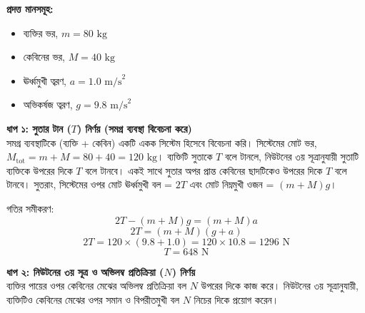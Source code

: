 \documentclass[12pt, a4paper]{article}
\begin{document}
\begin{tcolorbox}[solutionbox={সমাধান (Solution)}]
\noindent
\textbf{প্রদত্ত মানসমূহ:}
\begin{itemize}[leftmargin=*, parsep=0.3ex]
    \item ব্যক্তির ভর, $m = 80\text{ kg}$
    \item কেবিনের ভর, $M = 40\text{ kg}$
    \item ঊর্ধ্বমুখী ত্বরণ, $a = 1.0\text{ m/s}^2$
    \item অভিকর্ষজ ত্বরণ, $g = 9.8\text{ m/s}^2$
\end{itemize}

\vspace{0.5em}
\noindent
\textbf{ধাপ ১: সুতার টান ($T$) নির্ণয় (সমগ্র ব্যবস্থা বিবেচনা করে)} \\
সমগ্র ব্যবস্থাটিকে (ব্যক্তি + কেবিন) একটি একক সিস্টেম হিসেবে বিবেচনা করি। 
সিস্টেমের মোট ভর, $M_{\text{tot}} = m + M = 80 + 40 = 120\text{ kg}$।
ব্যক্তিটি সুতাকে $T$ বলে টানলে, নিউটনের ৩য় সূত্রানুযায়ী সুতাটি ব্যক্তিকে উপরের দিকে $T$ বলে টানবে। একই সাথে সুতার অপর প্রান্ত কেবিনের ছাদটিকেও উপরের দিকে $T$ বলে টানবে।
সুতরাং, সিস্টেমের ওপর মোট ঊর্ধ্বমুখী বল = $2T$ এবং মোট নিম্নমুখী ওজন = $(m + M)g$।

গতির সমীকরণ:
$$2T - (m + M)g = (m + M)a$$ 
$$2T = (m + M)(g + a)$$
$$2T = 120 \times (9.8 + 1.0) = 120 \times 10.8 = 1296\text{ N}$$ 
$$T = 648\text{ N}$$

\vspace{0.5em}
\noindent
\textbf{ধাপ ২: নিউটনের ৩য় সূত্র ও অভিলম্ব প্রতিক্রিয়া ($N$) নির্ণয়} \\
ব্যক্তির পায়ের ওপর কেবিনের মেঝের অভিলম্ব প্রতিক্রিয়া বল $N$ উপরের দিকে কাজ করে। নিউটনের ৩য় সূত্রানুযায়ী, ব্যক্তিটিও কেবিনের মেঝের ওপর সমান ও বিপরীতমুখী বল $N$ নিচের দিকে প্রয়োগ করেন।

\vspace{1em}
\begin{center}
\end{center}
\end{tcolorbox}
\end{document}
